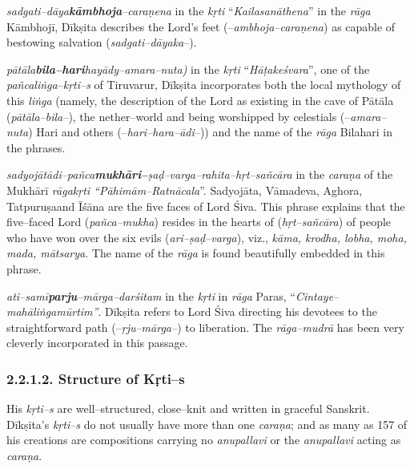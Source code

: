  \item \textit{sadgati–dāya\textbf{kāmbhoja}–caraṇena} in the \textit{kṛti} “\textit{Kailasanāthena}” in the \textit{rāga} Kāmbhojī, Dīkṣita describes the Lord’s feet (–\textit{ambhoja–caraṇena}) as capable of bestowing salvation (\textit{sadgati–dāyaka}–).

 \item \textit{pātāla\textbf{bila–hari}hayādy–amara–nuta)} in the \textit{kṛti} “\textit{Hāṭakeśvara}”, one of the \textit{pañcaliṅga}–\textit{kṛti–s} of Tiruvarur, Dīkṣita incorporates both the local mythology of this \textit{liṅga} (namely, the description of the Lord as existing in the cave of Pātāla (\textit{pātāla–bila–}), the nether–world and being worshipped by celestials (–\textit{amara–nuta}) Hari and others (–\textit{hari–hara–ādi–})) and the name of the \textit{rāga} Bilahari in the phrases.

 \item \textit{sadyojātādi–pañca\textbf{mukhāri–}ṣaḍ–varga–rahita–hṛt–sañcāra} in the \textit{caraṇa} of the Mukhārī\textit{ rāgakṛti “Pāhimām–Ratnācala}”. Sadyojāta, Vāmadeva, Aghora, Tatpuruṣaand Īśāna are the five faces of Lord Śiva. This phrase explains that the five–faced Lord (\textit{pañca–mukha}) resides in the hearts of (\textit{hṛt–sañcāra}) of people who have won over the six evils (\textit{ari–ṣaḍ–varga}), viz., \textit{kāma, krodha, lobha, moha, mada, mātsarya}. The name of the \textit{rāga} is found beautifully embedded in this phrase.

 \item \textit{ati–samī\textbf{parju}–mārga–darśitam} in the \textit{kṛti} in \textit{rāga} Paras, “\textit{Cintaye–mahāliṅgamūrtim”}. Dīkṣita refers to Lord Śiva directing his devotees to the straightforward path (–\textit{ṛju–mārga–}) to liberation. The \textit{rāga–mudrā} has been very cleverly incorporated in this passage.



\subsubsection*{2.2.1.2. Structure of Kṛti–s}

His \textit{kṛti–s} are well–structured, close–knit and written in graceful Sanskrit. Dīkṣita’s \textit{kṛti–s} do not usually have more than one \textit{caraṇa}; and as many as 157 of his creations are compositions carrying no \textit{anupallavi} or the \textit{anupallavi} acting as \textit{caraṇa}.

